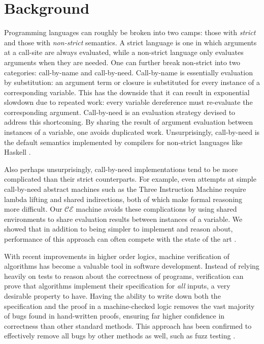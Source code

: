\section{Background} \label{sec:background}

Programming languages can roughly be broken into two camps: those with
\emph{strict} and those with \emph{non-strict} semantics. A strict language is
one in which arguments at a call-site are always evaluated, while a non-strict
language only evaluates arguments when they are needed. One can further break
non-strict into two categories: call-by-name and call-by-need. Call-by-name is
essentially evaluation by substitution: an argument term or closure is
substituted for every instance of a corresponding variable. This has the
downside that it can result in exponential slowdown due to repeated work: every
variable dereference must re-evaluate the corresponding argument. Call-by-need
is an evaluation strategy devised to address this shortcoming. By sharing the
result of argument evaluation between instances of a variable, one avoids
duplicated work.  Unsurprisingly, call-by-need is the default semantics
implemented by compilers for non-strict languages like Haskell \cite{jonesstg}. 

Also perhaps unsurprisingly, call-by-need implementations tend to be more
complicated than their strict counterparts. For example, even attempts at simple
call-by-need abstract machines such as the Three Instruction Machine \cite{TIM}
require lambda lifting and shared indirections, both of which make formal
reasoning more difficult. Our $\mathcal{CE}$ machine avoids these complications
by using shared environments to share evaluation results between instances of a
variable. We showed that in addition to being simpler to implement and reason
about, performance of this approach can often compete with the state of the art
\cite{cem}. 

With recent improvements in higher order logics, machine verification of
algorithms has become a valuable tool in software development. Instead of
relying heavily on tests to reason about the correctness of programs,
verification can prove that algorithms implement their specification for
\emph{all} inputs, a very desirable property to have. Having the ability to
write down both the specification and the proof in a machine-checked logic
removes the vast majority of bugs found in hand-written proofs, ensuring far
higher confidence in correctness than other standard methods. This approach has
been confirmed to effectively remove all bugs by other methods as well, such as
fuzz testing \cite{yangfuzz}.

